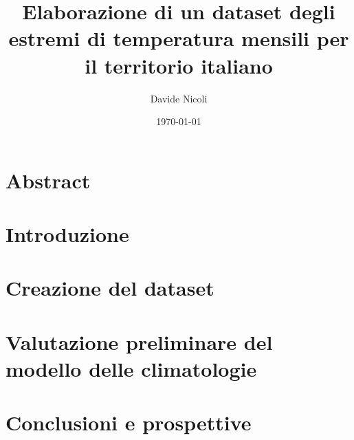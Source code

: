 \documentclass[a4paper, 12pt]{report}
\title{
  {Elaborazione di un dataset degli estremi di temperatura mensili per il territorio italiano}
}
\author{Davide Nicoli}
\date{\today}
\begin{document}



\chapter*{Abstract}

\tableofcontents


\chapter{Introduzione}\label{ch:intro}


\chapter{Creazione del dataset}


\chapter{Valutazione preliminare del modello delle climatologie}


\chapter{Conclusioni e prospettive}\label{ch:conclusioni}


\clearpage
\printbibliography{}
\end{document}
